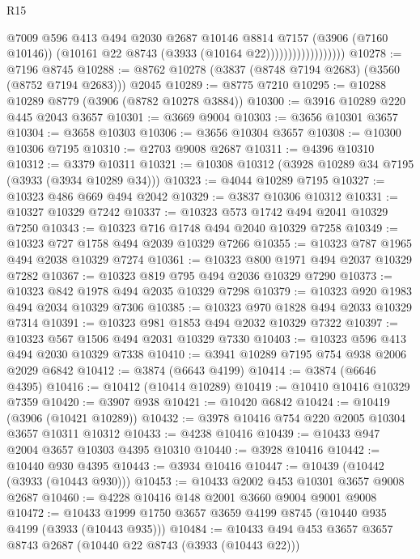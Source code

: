 \begin{lexlean}{R15}
\begin{coremodule}
                                  @7009
                                  @596
                                  @413
                                  @494
                                  @2030
                                  @2687
                                  @10146
                                  @8814
                                  @7157
                                  (@3906 (@7160 @10146))
                                  (@10161 @22 @8743 (@3933 (@10164 @22))))))))))))))))))
@10278 := @7196 @8745
@10288 := @8762 @10278 (@3837 (@8748 @7194 @2683) (@3560 (@8752 @7194 @2683))) @2045
@10289 := @8775 @7210
@10295 := @10288 @10289 @8779 (@3906 (@8782 @10278 @3884))
@10300 := @3916 @10289 @220 @445 @2043 @3657
@10301 := @3669 @9004
@10303 := @3656 @10301 @3657
@10304 := @3658 @10303
@10306 := @3656 @10304 @3657
@10308 := @10300 @10306 @7195
@10310 := @2703 @9008 @2687
@10311 := @4396 @10310
@10312 := @3379 @10311
@10321 := @10308 @10312 (@3928 @10289 @34 @7195 (@3933 (@3934 @10289 @34)))
@10323 := @4044 @10289 @7195
@10327 := @10323 @486 @669 @494 @2042
@10329 := @3837 @10306 @10312
@10331 := @10327 @10329 @7242
@10337 := @10323 @573 @1742 @494 @2041 @10329 @7250
@10343 := @10323 @716 @1748 @494 @2040 @10329 @7258
@10349 := @10323 @727 @1758 @494 @2039 @10329 @7266
@10355 := @10323 @787 @1965 @494 @2038 @10329 @7274
@10361 := @10323 @800 @1971 @494 @2037 @10329 @7282
@10367 := @10323 @819 @795 @494 @2036 @10329 @7290
@10373 := @10323 @842 @1978 @494 @2035 @10329 @7298
@10379 := @10323 @920 @1983 @494 @2034 @10329 @7306
@10385 := @10323 @970 @1828 @494 @2033 @10329 @7314
@10391 := @10323 @981 @1853 @494 @2032 @10329 @7322
@10397 := @10323 @567 @1506 @494 @2031 @10329 @7330
@10403 := @10323 @596 @413 @494 @2030 @10329 @7338
@10410 := @3941 @10289 @7195 @754 @938 @2006 @2029 @6842
@10412 := @3874 (@6643 @4199)
@10414 := @3874 (@6646 @4395)
@10416 := @10412 (@10414 @10289)
@10419 := @10410 @10416 @10329 @7359
@10420 := @3907 @938
@10421 := @10420 @6842
@10424 := @10419 (@3906 (@10421 @10289))
@10432 := @3978 @10416 @754 @220 @2005 @10304 @3657 @10311 @10312
@10433 := @4238 @10416
@10439 := @10433 @947 @2004 @3657 @10303 @4395 @10310
@10440 := @3928 @10416
@10442 := @10440 @930 @4395
@10443 := @3934 @10416
@10447 := @10439 (@10442 (@3933 (@10443 @930)))
@10453 := @10433 @2002 @453 @10301 @3657 @9008 @2687
@10460 := @4228 @10416 @148 @2001 @3660 @9004 @9001 @9008
@10472 := @10433 @1999 @1750 @3657 @3659 @4199 @8745 (@10440 @935 @4199 (@3933 (@10443 @935)))
@10484 := @10433 @494 @453 @3657 @3657 @8743 @2687 (@10440 @22 @8743 (@3933 (@10443 @22)))

\end{coremodule}
\end{lexlean}
